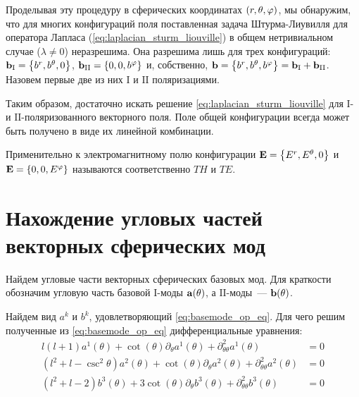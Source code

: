 \documentclass[12pt,a4paper]{article}
\begin{document}
        Проделывая эту процедуру в сферических координатах $\qty(r, \theta, \varphi)$, мы обнаружим, что для многих конфигураций поля поставленная задача Штурма-Лиувилля для оператора Лапласа (\autoref{eq:laplacian_sturm_liouville}) в общем нетривиальном случае ($\lambda \neq 0$) неразрешима. Она разрешима лишь для трех конфигураций: $\vb{b}_{\mathrm{I}} = \qty{ b^r, b^\theta, 0 }$, $\vb{b}_{\mathrm{II}} = \qty{ 0, 0, b^\varphi }$ и, собственно, $\vb{b} = \qty{ b^r, b^\theta, b^\varphi } = \vb{b}_{\mathrm{I}} + \vb{b}_{\mathrm{II}}$. Назовем первые две из них $\mathrm{I}$ и $\mathrm{II}$ поляризациями.

        Таким образом, достаточно искать решение \autoref{eq:laplacian_sturm_liouville} для $\mathrm{I}$- и $\mathrm{II}$-поляризованного векторного поля. Поле общей конфигурации всегда может быть получено в виде их линейной комбинации.

        Применительно к электромагнитному полю конфигурации $\vb{E} = \qty{ E^r, E^\theta, 0 }$ и $\vb{E} = \qty{ 0, 0, E^\varphi }$ называются соответственно\footnotemark{} $TH$ и $TE$.



    \section{Нахождение угловых частей векторных сферических мод}

        Найдем угловые части векторных сферических базовых мод. Для краткости обозначим угловую часть базовой $\mathrm{I}$-моды $\vb{a}(\theta)$, а $\mathrm{II}$-моды~--- $\vb{b}(\theta)$.

        Найдем вид $a^k$ и $b^k$, удовлетворяющий \autoref{eq:basemode_op_eq}. Для чего решим полученные из \autoref{eq:basemode_op_eq} дифференциальные уравнения:
        \begin{equation}\begin{aligned}
            l (l + 1) a^1(\theta)
                + \cot(\theta) \partial_\theta a^1(\theta)
                + \partial^2_{\theta\theta} a^1(\theta) &= 0 \\
            (l^2 + l - \csc^2\theta) a^2(\theta)
                + \cot(\theta) \partial_\theta a^2(\theta)
                + \partial^2_{\theta\theta} a^2(\theta) &= 0 \\
            (l^2 + l - 2) b^3(\theta)
                + 3 \cot(\theta) \partial_\theta b^3(\theta)
                + \partial^2_{\theta\theta} b^3(\theta) &= 0
        \end{aligned}\end{equation}
\end{document}
